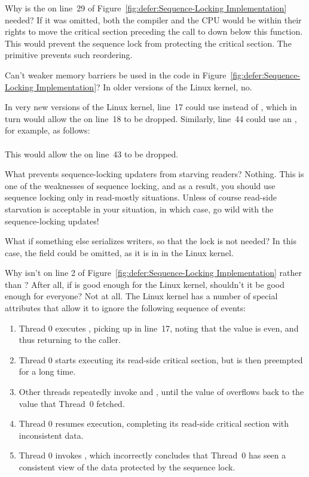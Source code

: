 \QuickQ{}
	Why is the  on line~29 of
	Figure~\ref{fig:defer:Sequence-Locking Implementation}
	needed?
\QuickA{}
	If it was omitted, both the compiler and the CPU would be
	within their rights to move the critical section preceding
	the call to  down below this function.
	This would prevent the sequence lock from protecting the
	critical section.
	The  primitive prevents such reordering.

\QuickQ{}
	Can't weaker memory barriers be used in the code in
	Figure~\ref{fig:defer:Sequence-Locking Implementation}?
\QuickA{}
	In older versions of the Linux kernel, no.

	In very new versions of the Linux kernel, line~17 could use
	 instead of , which
	in turn would allow the  on line~18 to be dropped.
	Similarly, line~44 could use an , for
	example, as follows: \\
	 \\
	This would allow the  on line~43 to be dropped.

\QuickQ{}
	What prevents sequence-locking updaters from starving readers?
\QuickA{}
	Nothing.
	This is one of the weaknesses of sequence locking, and as a
	result, you should use sequence locking only in read-mostly
	situations.
	Unless of course read-side starvation is acceptable in your
	situation, in which case, go wild with the sequence-locking updates!

\QuickQ{}
	What if something else serializes writers, so that the lock
	is not needed?
\QuickA{}
	In this case, the  field could be omitted, as it
	is in  in the Linux kernel.

\QuickQ{}
	Why isn't  on line 2 of
	Figure~\ref{fig:defer:Sequence-Locking Implementation}
	 rather than ?
	After all, if  is good enough for the Linux
	kernel, shouldn't it be good enough for everyone?
\QuickA{}
	Not at all.
	The Linux kernel has a number of special attributes that allow
	it to ignore the following sequence of events:
	\begin{enumerate}
	\item	Thread 0 executes , picking up
		 in line~17, noting that the value is even,
		and thus returning to the caller.
	\item	Thread 0 starts executing its read-side critical section,
		but is then preempted for a long time.
	\item	Other threads repeatedly invoke  and
		, until the value of 
		overflows back to the value that Thread~0 fetched.
	\item	Thread 0 resumes execution, completing its read-side
		critical section with inconsistent data.
	\item	Thread 0 invokes , which incorrectly
		concludes that Thread~0 has seen a consistent view of
		the data protected by the sequence lock.
	\end{enumerate}

